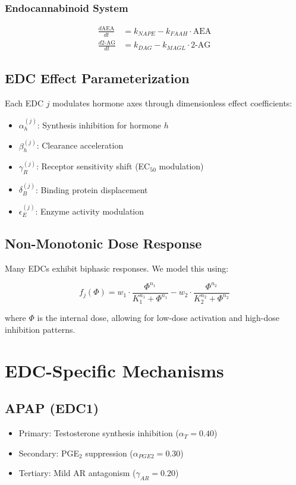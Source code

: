 \documentclass[11pt]{article}
\begin{document}
\subsubsection{Endocannabinoid System}
\begin{align}
\frac{d\text{AEA}}{dt} &= k_{NAPE} - k_{FAAH} \cdot \text{AEA} \\
\frac{d\text{2-AG}}{dt} &= k_{DAG} - k_{MAGL} \cdot \text{2-AG}
\end{align}

\subsection{EDC Effect Parameterization}

Each EDC $j$ modulates hormone axes through dimensionless effect coefficients:

\begin{itemize}
\item $\alpha_h^{(j)}$: Synthesis inhibition for hormone $h$
\item $\beta_h^{(j)}$: Clearance acceleration
\item $\gamma_R^{(j)}$: Receptor sensitivity shift (EC$_{50}$ modulation)
\item $\delta_B^{(j)}$: Binding protein displacement
\item $\epsilon_E^{(j)}$: Enzyme activity modulation
\end{itemize}

\subsection{Non-Monotonic Dose Response}

Many EDCs exhibit biphasic responses. We model this using:

\begin{equation}
f_j(\Phi) = w_1 \cdot \frac{\Phi^{n_1}}{K_1^{n_1} + \Phi^{n_1}} - w_2 \cdot \frac{\Phi^{n_2}}{K_2^{n_2} + \Phi^{n_2}}
\end{equation}

where $\Phi$ is the internal dose, allowing for low-dose activation and high-dose inhibition patterns.

\section{EDC-Specific Mechanisms}

\subsection{APAP (EDC1)}
\begin{itemize}
\item Primary: Testosterone synthesis inhibition ($\alpha_T = 0.40$)
\item Secondary: PGE$_2$ suppression ($\alpha_{PGE2} = 0.30$)
\item Tertiary: Mild AR antagonism ($\gamma_{AR} = 0.20$)
\end{itemize}
\end{document}
